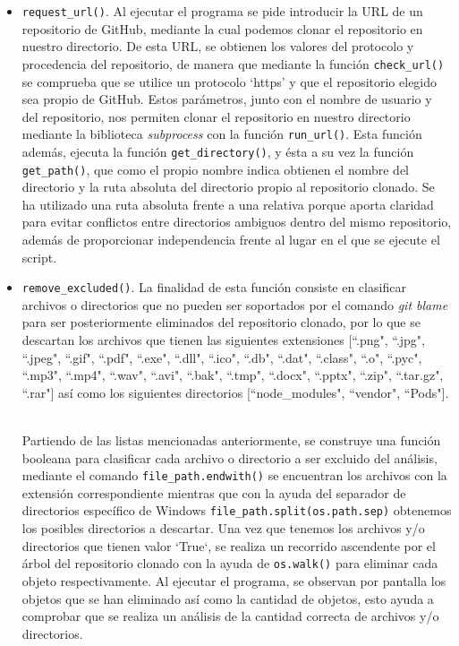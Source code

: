 \documentclass[a4paper, 12pt]{book}
\begin{document}
\begin{itemize}
  \item \texttt{request\_url()}. Al ejecutar el programa se pide introducir la URL de un repositorio de GitHub, mediante la cual podemos clonar el repositorio en nuestro directorio. De esta URL, se obtienen los valores del protocolo y procedencia del
  repositorio, de manera que mediante la función \texttt{check\_url()} se comprueba que se utilice un protocolo `https' y que el repositorio elegido sea propio de GitHub. Estos parámetros, junto con el nombre de usuario y del repositorio, nos permiten clonar
  el repositorio en nuestro directorio mediante la biblioteca \textit{subprocess} con la función \texttt{run\_url()}. Esta función además, ejecuta la función \texttt{get\_directory()}, y ésta a su vez la función \texttt{get\_path()}, que como el propio nombre
  indica obtienen el nombre del directorio y la ruta absoluta del directorio propio al repositorio clonado. Se ha utilizado una ruta absoluta frente a una relativa porque aporta claridad para evitar conflictos entre directorios ambiguos dentro del mismo repositorio,
  además de proporcionar independencia frente al lugar en el que se ejecute el script.

  \item \texttt{remove\_excluded()}. La finalidad de esta función consiste en clasificar archivos o directorios que no pueden ser soportados por el comando \textit{git blame} para ser posteriormente eliminados del repositorio clonado, por lo que 
  se descartan los archivos que tienen las siguientes extensiones [``.png", ``.jpg", ``.jpeg", ``.gif", ``.pdf", ``.exe", ``.dll", ``.ico", ``.db", ``.dat", ``.class", ``.o", ``.pyc", ``.mp3", ``.mp4", ``.wav", ``.avi", ``.bak", ``.tmp", ``.docx", ``.pptx", ``.zip",
  ``.tar.gz", ``.rar"] así como los siguientes directorios [``node\_modules", ``vendor", ``Pods"].
  
  \\Partiendo de las listas mencionadas anteriormente, se construye una función booleana para clasificar cada archivo o directorio a ser excluido del análisis, mediante el comando \texttt{file\_path.endwith()} se encuentran los archivos con la
  extensión correspondiente mientras que con la ayuda del separador de directorios específico de Windows \texttt{file\_path.split(os.path.sep)} obtenemos los posibles directorios a descartar. Una vez que tenemos los archivos y/o directorios que 
  tienen valor `True`, se realiza un recorrido ascendente por el árbol del repositorio clonado con la ayuda de \texttt{os.walk()} para eliminar cada objeto respectivamente. Al ejecutar el programa, se observan por pantalla los objetos que 
  se han eliminado así como la cantidad de objetos, esto ayuda a comprobar que se realiza un análisis de la cantidad correcta de archivos y/o directorios. 


\end{itemize}
\end{document}
